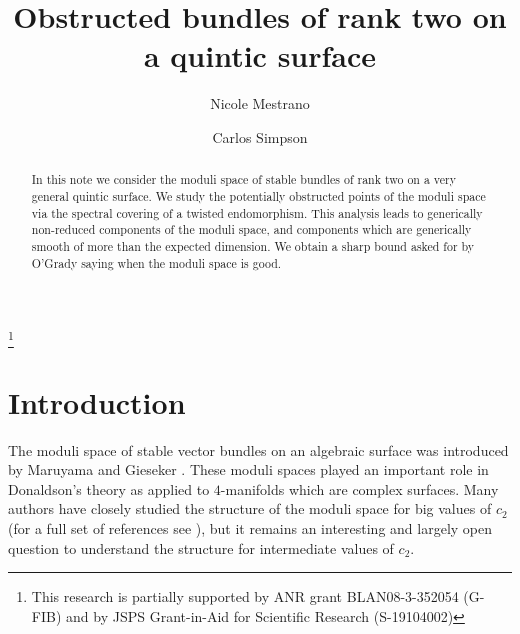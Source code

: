 \documentclass{amsart}
\theoremstyle{plain}
\numberwithin{equation}{section}
\begin{document}
\author[N. Mestrano]{Nicole Mestrano}
\address{CNRS, Laboratoire J. A. Dieudonn\'e, UMR 6621
\\ Universit\'e de Nice-Sophia Antipolis\\
06108 Nice, Cedex 2, France}

\author[C. Simpson]{Carlos Simpson}
\address{CNRS, Laboratoire J. A. Dieudonn\'e, UMR 6621
\\ Universit\'e de Nice-Sophia Antipolis\\
06108 Nice, Cedex 2, France}
\thanks{This research is partially supported by ANR grant BLAN08-3-352054 (G-FIB)
and by JSPS Grant-in-Aid for Scientific Research (S-19104002)}

\title[Obstructed bundles]{Obstructed bundles of rank two on a 
quintic surface}



\begin{abstract}
In this note we consider the moduli space of stable bundles of rank two on
a very general quintic surface. We study the potentially obstructed points of the moduli space
via the spectral covering of a twisted endomorphism.
This analysis leads to generically non-reduced components of the moduli space, and 
components which are generically smooth of more than the expected dimension. We obtain
a sharp bound asked for by O'Grady saying when the moduli space is good. 
\end{abstract}


\maketitle

\section{Introduction} \label{sec-introduction}

The moduli space of stable vector bundles on an algebraic surface was
introduced by Maruyama \cite{Maruyama} and Gieseker \cite{Gieseker}.  These
moduli spaces played an important
role in Donaldson's theory as applied to $4$-manifolds which are
complex surfaces. Many authors have closely
studied the structure of the moduli space for big values of $c_2$ 
(for a full set of references see \cite{HuybrechtsLehn}), 
but it remains an interesting and largely open question to understand the structure 
for intermediate values of $c_2$. 
\end{document}

